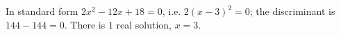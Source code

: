 In standard form $2x^2-12x+18=0$, i.e. $2(x-3)^2=0$; the discriminant is $144-144=0$. There is $\boxed{1}$ real solution, $x=3$.
